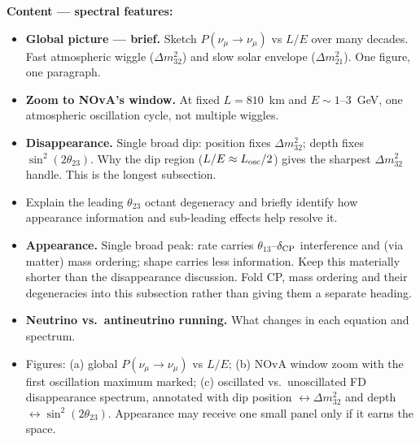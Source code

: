 \documentclass[11pt]{article}
\begin{document}
\textbf{Content --- spectral features:}
\begin{itemize}
    \item \textbf{Global picture --- brief.} Sketch $P(\nu_\mu\!\to\!\nu_\mu)$ vs $L/E$ over
    many decades. Fast atmospheric wiggle ($\Delta m^{2}_{32}$) and slow solar envelope
    ($\Delta m^{2}_{21}$). One figure, one paragraph.
    \item \textbf{Zoom to NOvA's window.} At fixed $L=810$~km and $E \sim 1$--$3$~GeV, one
    atmospheric oscillation cycle, not multiple wiggles.
    \item \textbf{Disappearance.} Single broad dip: position fixes $\Delta m^{2}_{32}$; depth
    fixes $\sin^{2}(2\theta_{23})$. Why the dip region ($L/E \approx L_{\rm osc}/2$) gives the
    sharpest $\Delta m^{2}_{32}$ handle. This is the longest subsection.
    \item Explain the leading $\theta_{23}$ octant degeneracy and briefly identify how appearance
    information and sub-leading effects help resolve it.
    \item \textbf{Appearance.} Single broad peak: rate carries $\theta_{13}$--$\delta_{\rm CP}$
    interference and (via matter) mass ordering; shape carries less information. Keep this
    materially shorter than the disappearance discussion. Fold CP, mass ordering and their
    degeneracies into this subsection rather than giving them a separate heading.
    \item \textbf{Neutrino vs.\ antineutrino running.} What changes in each equation and spectrum.
    \item Figures: (a) global $P(\nu_\mu\to\nu_\mu)$ vs $L/E$; (b) NOvA window zoom with the
    first oscillation maximum marked; (c) oscillated vs.\ unoscillated FD disappearance spectrum,
    annotated with dip position $\leftrightarrow \Delta m^{2}_{32}$ and depth
    $\leftrightarrow \sin^{2}(2\theta_{23})$. Appearance may receive one small panel only if it
    earns the space.
\end{itemize}
\end{document}
